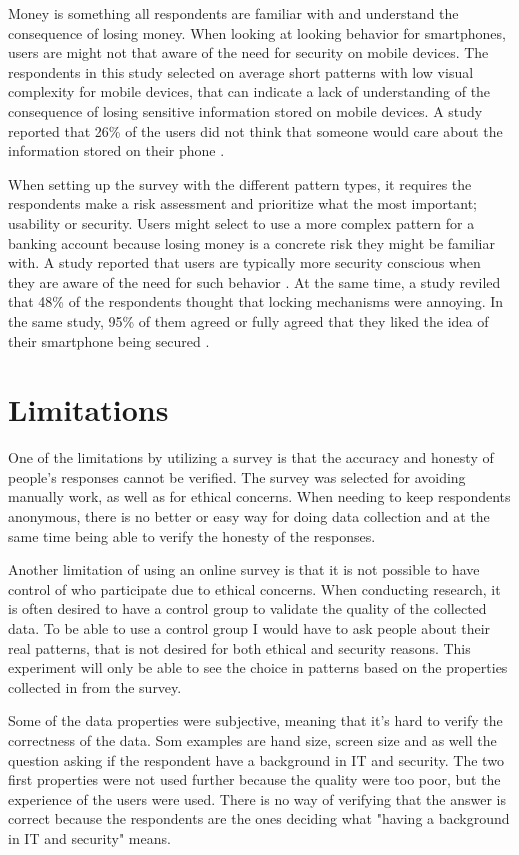     Money is something all respondents are familiar with and understand the consequence of losing money. When looking at looking behavior for smartphones, users are might not that aware of the need for security on mobile devices. The respondents in this study selected on average short patterns with low visual complexity for mobile devices, that can indicate a lack of understanding of the consequence of losing sensitive information stored on mobile devices. A study reported that 26\% of the users did not think that someone would care about the information stored on their phone \cite{Egelman}. 

    When setting up the survey with the different pattern types, it requires the respondents make a risk assessment and prioritize what the most important; usability or security. Users might select to use a more complex pattern for a banking account because losing money is a concrete risk they might be familiar with. A study reported that users are typically more security conscious when they are aware of the need for such behavior \cite{Sasse}. At the same time, a study reviled that 48\% of the respondents thought that locking mechanisms were annoying. In the same study, 95\% of them agreed or fully agreed that they liked the idea of their smartphone being secured \cite{habits3}. 

  \section{Limitations}\label{sec:limitations}
    One of the limitations by utilizing a survey is that the accuracy and honesty of people's responses cannot be verified. The survey was selected for avoiding manually work, as well as for ethical concerns. When needing to keep respondents anonymous, there is no better or easy way for doing data collection and at the same time being able to verify the honesty of the responses. 

    Another limitation of using an online survey is that it is not possible to have control of who participate due to ethical concerns. When conducting research, it is often desired to have a control group to validate the quality of the collected data. To be able to use a control group I would have to ask people about their real patterns, that is not desired for both ethical and security reasons. This experiment will only be able to see the choice in patterns based on the properties collected in from the survey.

    Some of the data properties were subjective, meaning that it's hard to verify the correctness of the data. Som examples are hand size, screen size and as well the question asking if the respondent have a background in IT and security. The two first properties were not used further because the quality were too poor, but the experience of the users were used. There is no way of verifying that the answer is correct because the respondents are the ones deciding what "having a background in IT and security" means. 

